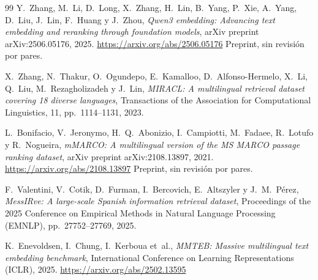 \documentclass[11pt,letterpaper]{article}
\numberwithin{equation}{section}
\begin{document}
\begin{thebibliography}{99}
Y.~Zhang, M.~Li, D.~Long, X.~Zhang, H.~Lin, B.~Yang, P.~Xie, A.~Yang, D.~Liu, J.~Lin, F.~Huang y J.~Zhou,
\textit{{Qwen3} embedding: Advancing text embedding and reranking through foundation models},
arXiv preprint arXiv:2506.05176, 2025.
\url{https://arxiv.org/abs/2506.05176} Preprint, sin revisión por pares.

X.~Zhang, N.~Thakur, O.~Ogundepo, E.~Kamalloo, D.~Alfonso-Hermelo, X.~Li, Q.~Liu, M.~Rezagholizadeh y J.~Lin,
\textit{{MIRACL}: A multilingual retrieval dataset covering 18 diverse languages},
Transactions of the Association for Computational Linguistics, 11, pp.~1114--1131, 2023.

L.~Bonifacio, V.~Jeronymo, H.~Q.~Abonizio, I.~Campiotti, M.~Fadaee, R.~Lotufo y R.~Nogueira,
\textit{{mMARCO}: A multilingual version of the {MS MARCO} passage ranking dataset},
arXiv preprint arXiv:2108.13897, 2021.
\url{https://arxiv.org/abs/2108.13897} Preprint, sin revisión por pares.

F.~Valentini, V.~Cotik, D.~Furman, I.~Bercovich, E.~Altszyler y J.~M.~P{\'e}rez,
\textit{{MessIRve}: A large-scale {S}panish information retrieval dataset},
Proceedings of the 2025 Conference on Empirical Methods in Natural Language Processing (EMNLP), pp.~27752--27769, 2025.

K.~Enevoldsen, I.~Chung, I.~Kerboua et~al.,
\textit{{MMTEB}: Massive multilingual text embedding benchmark},
International Conference on Learning Representations (ICLR), 2025.
\url{https://arxiv.org/abs/2502.13595}


\end{thebibliography}
\end{document}
